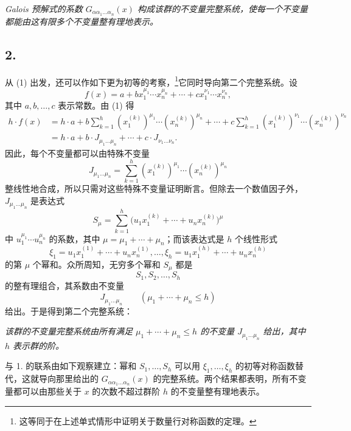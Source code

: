 \emph{Galois 预解式的系数 $G_{\alpha\alpha_1\ldots\alpha_n}(x)$ 构成该群的不变量完整系统，使每一个不变量都能由这有限多个不变量整有理地表示。}

\subsection*{2.}
从 (1) 出发，还可以作如下更为初等的考察，\footnote{这等同于在上述单式情形中证明关于数量行对称函数的定理。}它同时导向第二个完整系统。设
\[
  f(x)=a+b x_1^{\mu_1}\cdots x_n^{\mu_n}
       +\cdots+c x_1^{\nu_1}\cdots x_n^{\nu_n},
\]
其中 $a,b,\ldots,c$ 表示常数。由 (1) 得
\[
\begin{aligned}
 h\cdot f(x)
 &=h\cdot a+b\sum_{k=1}^{h}(x_1^{(k)})^{\mu_1}\cdots(x_n^{(k)})^{\mu_n}
     +\cdots
     +c\sum_{k=1}^{h}(x_1^{(k)})^{\nu_1}\cdots(x_n^{(k)})^{\nu_n} \\
 &=h\cdot a+b\cdot J_{\mu_1\ldots\mu_n}+\cdots+c\cdot J_{\nu_1\ldots\nu_n}.
\end{aligned}
\]
因此，每个不变量都可以由特殊不变量
\[
  J_{\mu_1\ldots\mu_n}
  =\sum_{k=1}^{h}(x_1^{(k)})^{\mu_1}\cdots(x_n^{(k)})^{\mu_n}
\]
整线性地合成，所以只需对这些特殊不变量证明断言。但除去一个数值因子外，$J_{\mu_1\ldots\mu_n}$ 是表达式
\[
  S_\mu=\sum_{k=1}^{h}
  \bigl(u_1x_1^{(k)}+\cdots+u_nx_n^{(k)}\bigr)^{\mu}
\]
中 $u_1^{\mu_1}\cdots u_n^{\mu_n}$ 的系数，其中 $\mu=\mu_1+\cdots+\mu_n$；而该表达式是 $h$ 个线性形式
\[
  \xi_1=u_1x_1^{(1)}+\cdots+u_nx_n^{(1)},\ldots,
  \xi_h=u_1x_1^{(h)}+\cdots+u_nx_n^{(h)}
\]
的第 $\mu$ 个幂和。众所周知，无穷多个幂和 $S_\mu$ 都是
\[
  S_1,S_2,\ldots,S_h
\]
的整有理组合，其系数由不变量
\[
  J_{\mu_1\ldots\mu_n}\qquad(\mu_1+\cdots+\mu_n\le h)
\]
给出。于是得到第二个完整系统：

\emph{该群的不变量完整系统由所有满足 $\mu_1+\cdots+\mu_n\le h$ 的不变量 $J_{\mu_1\ldots\mu_n}$ 给出，其中 $h$ 表示群的阶。}

与 1. 的联系由如下观察建立：幂和 $S_1,\ldots,S_h$ 可以用 $\xi_1,\ldots,\xi_h$ 的初等对称函数替代，这就导向那里给出的 $G_{\alpha\alpha_1\ldots\alpha_n}(x)$ 的完整系统。两个结果都表明，所有不变量都可以由那些关于 $x$ 的次数不超过群阶 $h$ 的不变量整有理地表示。

